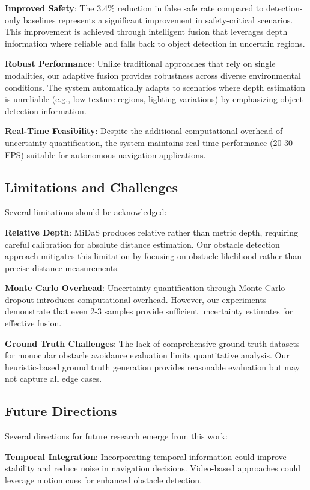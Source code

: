 \documentclass[12pt,oneside]{book}
\begin{document}
\textbf{Improved Safety}: The 3.4\% reduction in false safe rate compared to detection-only baselines represents a significant improvement in safety-critical scenarios. This improvement is achieved through intelligent fusion that leverages depth information where reliable and falls back to object detection in uncertain regions.

\textbf{Robust Performance}: Unlike traditional approaches that rely on single modalities, our adaptive fusion provides robustness across diverse environmental conditions. The system automatically adapts to scenarios where depth estimation is unreliable (e.g., low-texture regions, lighting variations) by emphasizing object detection information.

\textbf{Real-Time Feasibility}: Despite the additional computational overhead of uncertainty quantification, the system maintains real-time performance (20-30 FPS) suitable for autonomous navigation applications.

\subsection{Limitations and Challenges}

Several limitations should be acknowledged:

\textbf{Relative Depth}: MiDaS produces relative rather than metric depth, requiring careful calibration for absolute distance estimation. Our obstacle detection approach mitigates this limitation by focusing on obstacle likelihood rather than precise distance measurements.

\textbf{Monte Carlo Overhead}: Uncertainty quantification through Monte Carlo dropout introduces computational overhead. However, our experiments demonstrate that even 2-3 samples provide sufficient uncertainty estimates for effective fusion.

\textbf{Ground Truth Challenges}: The lack of comprehensive ground truth datasets for monocular obstacle avoidance evaluation limits quantitative analysis. Our heuristic-based ground truth generation provides reasonable evaluation but may not capture all edge cases.

\subsection{Future Directions}

Several directions for future research emerge from this work:

\textbf{Temporal Integration}: Incorporating temporal information could improve stability and reduce noise in navigation decisions. Video-based approaches could leverage motion cues for enhanced obstacle detection.
\end{document}
